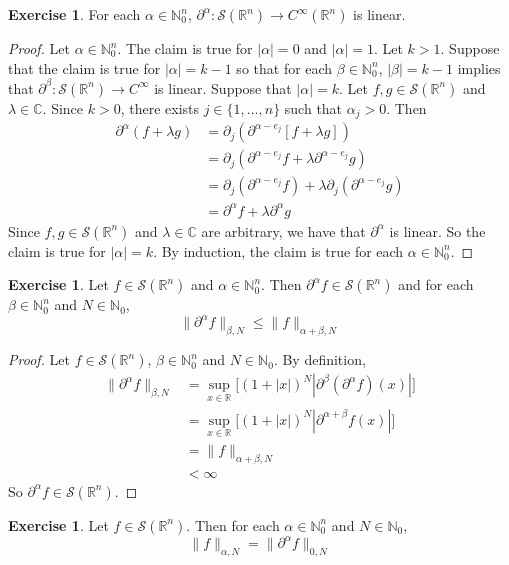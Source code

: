 \documentclass{book}
\theoremstyle{definition}
\newtheorem{ex}[definition]{Exercise}
\newcommand{\al}{\alpha}
\newcommand{\be}{\beta}
\newcommand{\lam}{\lambda}
\newcommand{\C}{\mathbb{C}}
\newcommand{\N}{\mathbb{N}}
\newcommand{\R}{\mathbb{R}}
\newcommand{\MS}{\mathcal{S}}
\DeclareMathOperator*{\0}{\mbf{0}}
\DeclareMathOperator*{\1}{\mbf{1}}
\newcommand{\p}{\partial}
\begin{document}
	\begin{ex}
		For each $\al \in \N_0^n$, $\p^{\al}: \MS(\R^n) \rightarrow C^{\infty}(\R^n)$ is linear. 
	\end{ex}
	
	\begin{proof}
		Let $\al \in \N_0^n$. The claim is true for $|\al| = 0$ and $|\al| = 1$. Let $k > 1$. Suppose that the claim is true for $|\al| = k-1$ so that for each $\be \in \N_0^n$, $|\be| = k-1$ implies that $\p^{\be}: \MS(\R^n) \rightarrow C^{\infty}$ is linear. Suppose that $|\al| = k$. Let $f, g \in \MS(\R^n)$ and $\lam \in \C$. Since $k > 0$, there exists $j \in \{1, \ldots, n\}$ such that $\al_j > 0$. Then 
		\begin{align*}
			\p^{\al}(f + \lam g) 
			& = \p_j(\p^{\al - e_j} [f + \lam g]) \\
			& =  \p_j(\p^{\al - e_j}f + \lam \p^{\al - e_j} g) \\
			& = \p_j(\p^{\al - e_j}f ) + \lam \p_j (\p^{\al - e_j} g) \\
			& = \p^{\al} f + \lam \p^{\al} g
		\end{align*} 
		Since $f, g \in \MS(\R^n)$ and $\lam \in \C$ are arbitrary, we have that $\p^{\al}$ is linear. So the claim is true for $|\al| = k$. By induction, the claim is true for each $\al \in \N_0^n$.
	\end{proof}
	
	\begin{ex}
		Let $f \in \MS(\R^n)$ and $\al \in \N_0^n$. Then $\p^{\al}f \in \MS(\R^n)$ and for each $\be \in \N_0^n$ and $N \in \N_0$, 
		$$\|\p^{\al} f \|_{\be, N} \leq \|f \|_{\al + \be, N}$$ 
	\end{ex}
	
	\begin{proof}
		Let $f \in \MS(\R^n)$, $\be \in \N_0^n$ and $N \in \N_0$. By definition, 
		\begin{align*}
			\|\p^{\al} f \|_{\be, N}
			& = \sup_{x \in \R} \bigg[ (1 + |x|)^N |\p^{\be} (\p^{\al} f) (x)| \bigg] \\
			&= \sup_{x \in \R} \bigg[ (1 + |x|)^N |\p^{\al + \be}f (x)| \bigg] \\
			& = \|f \|_{\al + \be, N} \\
			& < \infty
		\end{align*}
		So $\p^{\al}f \in \MS(\R^n)$.
	\end{proof}
	
	\begin{ex}
		Let $f \in \MS(\R^n)$. Then for each $\al\in \N_0^n$ and $N \in \N_0$, 
		$$\|f\|_{\al, N} = \|\p^{\al} f\|_{0, N}$$
	\end{ex}
	
\end{document}
